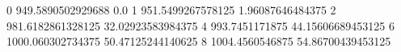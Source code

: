 0 949.5890502929688 0.0
1 951.5499267578125 1.96087646484375
2 981.6182861328125 32.02923583984375
4 993.7451171875 44.15606689453125
6 1000.060302734375 50.47125244140625
8 1004.4560546875 54.86700439453125
